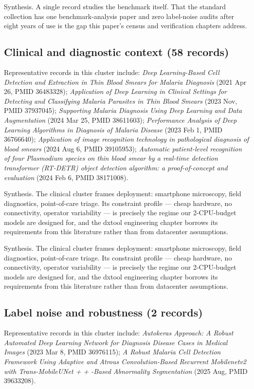 Synthesis. A single record studies the benchmark itself. That the standard collection has one benchmark-analysis paper and zero label-noise audits after eight years of use is the gap this paper's census and verification chapters address.


\subsection*{Clinical and diagnostic context (58 records)}
Representative records in this cluster include: \emph{Deep Learning-Based Cell Detection and Extraction in Thin Blood Smears for Malaria Diagnosis} (2021 Apr 26, PMID 36483328); \emph{Application of Deep Learning in Clinical Settings for Detecting and Classifying Malaria Parasites in Thin Blood Smears} (2023 Nov, PMID 37937045); \emph{Supporting Malaria Diagnosis Using Deep Learning and Data Augmentation} (2024 Mar 25, PMID 38611603); \emph{Performance Analysis of Deep Learning Algorithms in Diagnosis of Malaria Disease} (2023 Feb 1, PMID 36766640); \emph{Application of image recognition technology in pathological diagnosis of blood smears} (2024 Aug 6, PMID 39105953); \emph{Automatic patient-level recognition of four Plasmodium species on thin blood smear by a real-time detection transformer (RT-DETR) object detection algorithm: a proof-of-concept and evaluation} (2024 Feb 6, PMID 38171008).\par

Synthesis. The clinical cluster frames deployment: smartphone microscopy, field diagnostics, point-of-care triage. Its constraint profile --- cheap hardware, no connectivity, operator variability --- is precisely the regime our 2-CPU-budget models are designed for, and the dxtool engineering chapter borrows its requirements from this literature rather than from datacenter assumptions.


Synthesis. The clinical cluster frames deployment: smartphone microscopy, field diagnostics, point-of-care triage. Its constraint profile --- cheap hardware, no connectivity, operator variability --- is precisely the regime our 2-CPU-budget models are designed for, and the dxtool engineering chapter borrows its requirements from this literature rather than from datacenter assumptions.


\subsection*{Label noise and robustness (2 records)}
Representative records in this cluster include: \emph{Autokeras Approach: A Robust Automated Deep Learning Network for Diagnosis Disease Cases in Medical Images} (2023 Mar 8, PMID 36976115); \emph{A Robust Malaria Cell Detection Framework Using Adaptive and Atrous Convolution-Based Recurrent Mobilenetv2 with Trans-MobileUNet + + -Based Abnormality Segmentation} (2025 Aug, PMID 39633208).\par

